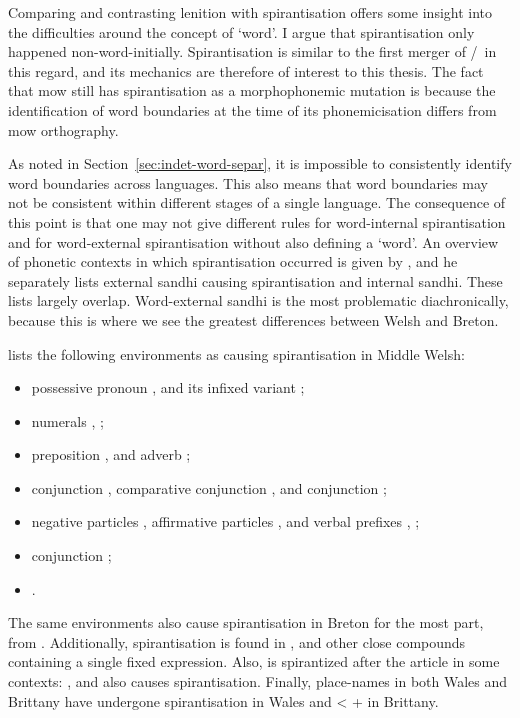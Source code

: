Comparing and contrasting lenition with spirantisation offers some insight into the difficulties around the concept of `word'. I argue that spirantisation only happened non-word-initially.
Spirantisation is similar to the first merger of \lT/\xD\ in this regard, and its mechanics are therefore of interest to this thesis.
The fact that \gls{mow} still has spirantisation as a morphophonemic mutation is because the identification of word boundaries at the time of its phonemicisation differs from \gls{mow} orthography.

As noted in Section~\ref{sec:indet-word-separ}, it is impossible to consistently identify word boundaries across languages.
This also means that word boundaries may not be consistent within different stages of a single language.
The consequence of this point is that one may not give different rules for word-internal spirantisation and for word-external spirantisation without also defining a `word'.
An overview of phonetic contexts in which spirantisation occurred is given by \textcite[2--3]{schrijver_spirantization_1999}, and he separately lists external sandhi causing spirantisation and internal sandhi.
These lists largely overlap.
Word-external sandhi is the most problematic diachronically, because this is where we see the greatest differences between Welsh and Breton.


\Textcite[\S 24]{evans_grammar_1964} lists the following environments as causing spirantisation in  Middle Welsh:
\begin{itemize}
\item possessive pronoun , and its infixed variant ;
\item numerals , ;
\item preposition , and adverb ;
\item conjunction , comparative conjunction , and conjunction ;
\item negative particles , affirmative particles , and verbal prefixes , \etc;
\item conjunction ;
\item {}.
\end{itemize}
The same environments also cause spirantisation in Breton for the most part, \eg {} from .
Additionally,  spirantisation is found in , and other close compounds containing a single fixed expression.
Also,  is spirantized after the article in some contexts: , and  also causes spirantisation.
Finally, place-names in both Wales and Brittany have undergone spirantisation \eg {} in Wales and  <  +  in Brittany.

